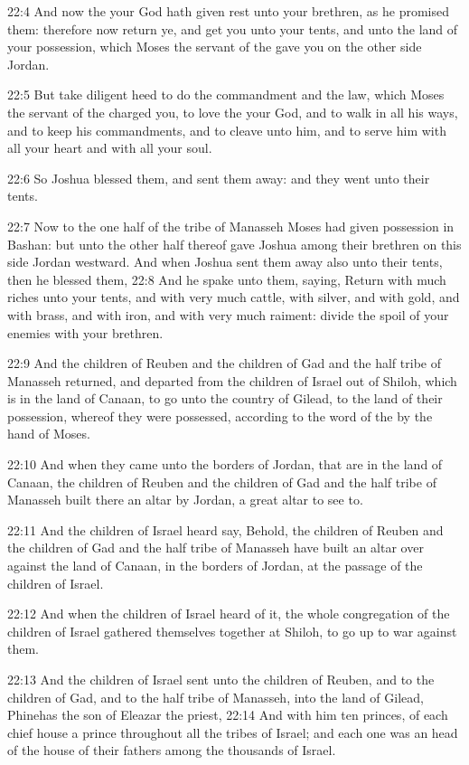 22:4 And now the \LORD your God hath given rest unto your brethren, as he promised them: therefore now return ye, and get you unto your tents, and unto the land of your possession, which Moses the servant of the \LORD gave you on the other side Jordan.

22:5 But take diligent heed to do the commandment and the law, which Moses the servant of the \LORD charged you, to love the \LORD your God, and to walk in all his ways, and to keep his commandments, and to cleave unto him, and to serve him with all your heart and with all your soul.

22:6 So Joshua blessed them, and sent them away: and they went unto their tents.

22:7 Now to the one half of the tribe of Manasseh Moses had given possession in Bashan: but unto the other half thereof gave Joshua among their brethren on this side Jordan westward. And when Joshua sent them away also unto their tents, then he blessed them, 22:8 And he spake unto them, saying, Return with much riches unto your tents, and with very much cattle, with silver, and with gold, and with brass, and with iron, and with very much raiment: divide the spoil of your enemies with your brethren.

22:9 And the children of Reuben and the children of Gad and the half tribe of Manasseh returned, and departed from the children of Israel out of Shiloh, which is in the land of Canaan, to go unto the country of Gilead, to the land of their possession, whereof they were possessed, according to the word of the \LORD by the hand of Moses.

22:10 And when they came unto the borders of Jordan, that are in the land of Canaan, the children of Reuben and the children of Gad and the half tribe of Manasseh built there an altar by Jordan, a great altar to see to.

22:11 And the children of Israel heard say, Behold, the children of Reuben and the children of Gad and the half tribe of Manasseh have built an altar over against the land of Canaan, in the borders of Jordan, at the passage of the children of Israel.

22:12 And when the children of Israel heard of it, the whole congregation of the children of Israel gathered themselves together at Shiloh, to go up to war against them.

22:13 And the children of Israel sent unto the children of Reuben, and to the children of Gad, and to the half tribe of Manasseh, into the land of Gilead, Phinehas the son of Eleazar the priest, 22:14 And with him ten princes, of each chief house a prince throughout all the tribes of Israel; and each one was an head of the house of their fathers among the thousands of Israel.

